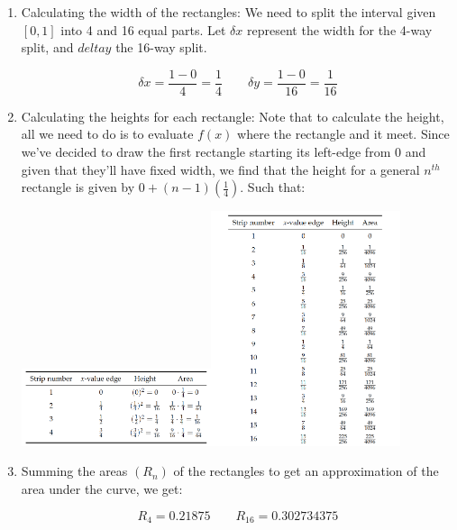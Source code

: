 \documentclass[english,course]{Notes}
\begin{document}
\begin{enumerate}
	\item{Calculating the width of the rectangles: We need to split the interval given $[0,1]$ into 4 and 16 equal parts. Let $\delta x$ represent the width for the 4-way split, and $delta y$ the 16-way split.}
	
	$$\delta x = \frac{1-0}{4} = \frac{1}{4} \quad \quad \delta y = \frac{1-0}{16} = \frac{1}{16}$$
	
	\item{Calculating the heights for each rectangle: Note that to calculate the height, all we need to do is to evaluate $f(x)$ where the rectangle and it meet. Since we've decided to draw the first rectangle starting its left-edge from $0$ and given that they'll have fixed width, we find that the height for a general $n^{th}$ rectangle is given by $0 + (n-1) (\frac{1}{4})$. Such that:
	
\includegraphics[width=15em]{area4strips}\includegraphics[width=15em]{area16strips}
}

	\item{Summing the areas $(R_n)$ of the rectangles to get an approximation of the area under the curve, we get:
	
	$$R_4 = 0.21875 \quad \quad R_16 = 0.302734375 $$
	
	
	}
	


\end{enumerate}
\end{document}
